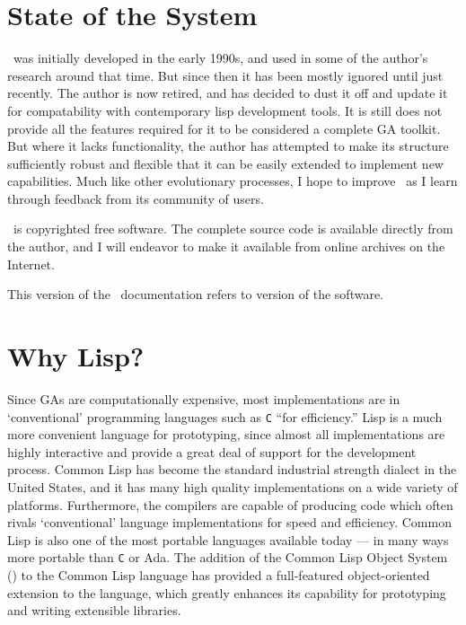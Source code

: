 \section{State of the System}

\Geco\ was initially developed in the early 1990s, and used in some of the author's
research around that time. But since then it has been mostly ignored
until just recently. The author is now retired, and
has decided to dust it off and update it for compatability with contemporary lisp
development tools.
It is still does not provide
all the features required for it to be considered a complete GA toolkit. But
where it lacks functionality, the author has attempted to make its structure sufficiently 
robust and flexible that it can be easily extended to implement new
capabilities. Much like other evolutionary
processes, I hope to improve \geco\ as I learn through feedback from its
community of users.

\Geco\ is copyrighted free software. The complete source code is available
directly from the author, and I will endeavor to make it available from online archives on
the Internet.

This version of the \geco\ documentation refers to version
\gecoversion{} of the software.

\section{Why Lisp?}

Since GAs are computationally expensive, most implementations are in
`conventional' programming languages such as {\tt C} ``for efficiency.'' Lisp is
a much more convenient language for prototyping, since almost all
implementations are highly interactive and provide a great deal of support for
the development process. Common Lisp has become the standard industrial
strength dialect in the United States, and it has many high quality
implementations on a wide variety of platforms. Furthermore, the compilers are
capable of producing code which often rivals `conventional' language
implementations for speed and efficiency. Common Lisp is also one of the most
portable languages available today --- in many ways more portable than {\tt C}
or Ada. The addition of the Common Lisp Object System
() to the Common Lisp language \cite{cl:steele2,cl:keene} has
provided a full-featured object-oriented extension to the language, which
greatly enhances its capability for prototyping and writing extensible
libraries.


